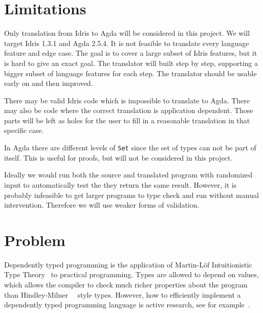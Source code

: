 \documentclass[parskip=half]{scrartcl}
\begin{document}
\section{Limitations}
Only translation from Idris to Agda will be considered in this project. We will
target Idris 1.3.1 and Agda 2.5.4. It is not feasible to translate every
language feature and edge case.  The goal is to cover a large subset of Idris
features, but it is hard to give an exact goal.  The translator will built step
by step, supporting a bigger subset of language features for each step. The
translator should be usable early on and then improved.

There may be valid Idris code which is impossible to translate to Agda. There
may also be code where the correct translation is application dependent. Those
parts will be left as holes for the user to fill in a reasonable translation in
that specific case.


In Agda there are different levels of \texttt{Set} since the set of types can
not be part of itself. This is useful for proofs, but will not be considered in
this project.

Ideally we would run both the source and translated program with randomized
input to automatically test the they return the same result. However, it is
probably infeasible to get larger programs to type check and run without manual
intervention.  Therefore we will use weaker forms of validation.

\section{Problem}

Dependently typed programming is the application of Martin-Löf
Intuitionistic Type Theory~\cite{martinlof} to practical programming.
Types are allowed to depend on values, which allows the compiler to check much
richer properties about the program than Hindley-Milner~\cite{hindley}~\cite{milner}
style types. However, how to efficiently implement a dependently typed
programming language is active research, see for
example~\cite{quantitative-type-theory}.
\end{document}
